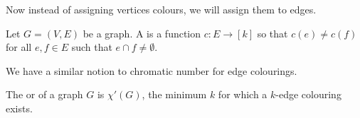 \documentclass[a4paper]{scrartcl}
\begin{document}
Now instead of assigning vertices colours, we will assign them to edges. 

\begin{definition}
	Let $G = (V, E)$ be a graph. A  is a function $c:E \rightarrow [k]$ so that $c(e) \neq c(f)$ for all $e, f \in E$ such that $e \cap f \neq \emptyset.$
\end{definition}

We have a similar notion to chromatic number for edge colourings.

\begin{definition}
	The  or  of a graph $G$ is $\chi'(G)$, the minimum $k$ for which a $k$-edge colouring exists.
\end{definition}
\end{document}
